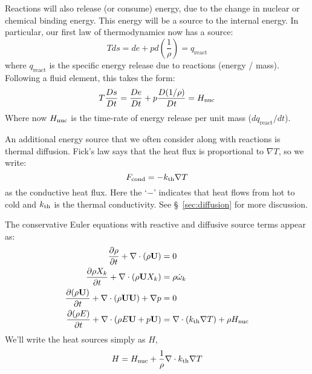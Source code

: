 Reactions will also release (or consume) energy, due to the change in
nuclear or chemical binding energy.  This energy will be a source to
the internal energy.  In particular, our first law of thermodynamics
now has a source:
\begin{equation}
T ds = de + p d \left( \frac{1}{\rho}\right ) = q_\mathrm{react}
\end{equation}
where $q_\mathrm{react}$ is the specific energy release due to
reactions (energy / mass).  Following a fluid element, this takes the
form:
\begin{equation}
T{\frac{{Ds}}{D t}} = {\frac{{De}}{D t}} + p {\frac{{D(1/\rho)}}{D t}} = {H_\mathrm{nuc}}
\end{equation}
Where now ${H_\mathrm{nuc}}$ is the time-rate of energy release per unit mass
($dq_\mathrm{react}/dt$).

An additional energy source that we often consider along with reactions
is thermal diffusion.  Fick's law says that the heat flux is proportional
to $\nabla T$, so we write:
\begin{equation}
F_\mathrm{cond} = -{k_\mathrm{th}} \nabla T
\end{equation}
as the conductive heat flux.  Here the `$-$' indicates that heat flows
from hot to cold and ${k_\mathrm{th}}$ is the thermal conductivity.  See
\S~\ref{sec:diffusion} for more discussion.

The conservative Euler equations with reactive and diffusive source terms
appear as:
\begin{align}
{\frac{{\partial\rho}}{\partial t}} + \nabla \cdot (\rho {\bf U}) &= 0 \\
{\frac{{\partial\rho X_k}}{\partial t}} + \nabla \cdot (\rho {\bf U} X_k) &= \rho {\dot{\omega}}_k \\
{\frac{{\partial(\rho {\bf U})}}{\partial t}} + \nabla \cdot (\rho {\bf U} {\bf U}) + \nabla p &= 0 \\
{\frac{{\partial(\rho E)}}{\partial t}} + \nabla \cdot (\rho E {\bf U} + p {\bf U} ) &= \nabla \cdot ({k_\mathrm{th}} \nabla T) + \rho {H_\mathrm{nuc}}
\end{align}
We'll write the heat sources simply as $H$, 
\begin{equation}
H = {H_\mathrm{nuc}} + \frac{1}{\rho} \nabla \cdot {k_\mathrm{th}} \nabla T
\end{equation}

